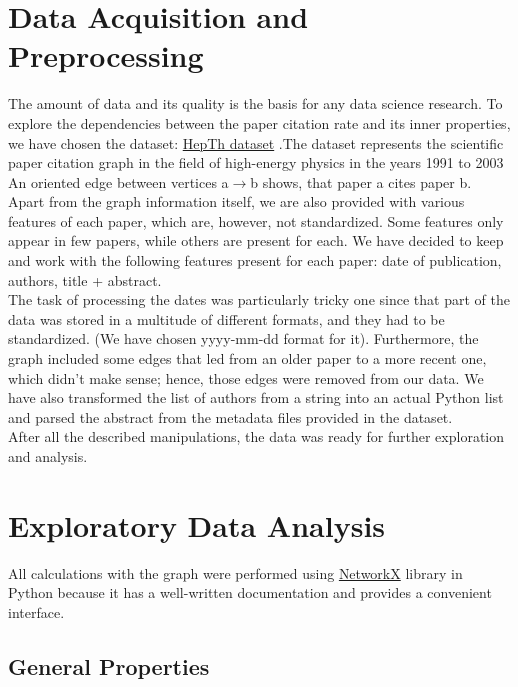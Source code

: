 \documentclass{article}
\newcommand\tab[1][1cm]{\hspace*{#1}}
\begin{document}
\section{Data Acquisition and Preprocessing}

\tab	The amount of data and its quality is the basis for any data science research. To explore the dependencies between the paper citation rate and its inner properties, we have chosen the dataset: \href{https://www.kaggle.com/datasets/wolfram77/graphs-snap-cit}{HepTh dataset} .The dataset represents the scientific paper citation graph in the field of high-energy physics in the years 1991 to 2003 \\
\tab	 An oriented edge between vertices a$\rightarrow$b shows, that paper a cites paper b. Apart from the graph information itself, we are also provided with various features of each paper, which are, however, not standardized. Some features only appear in few papers, while others are present for each. We have decided to keep and work with the following features present for each paper: date of publication, authors, title + abstract. \\
\tab	The task of processing the dates was particularly tricky one since that part of the data was stored in a multitude of different formats, and they had to be standardized. (We have chosen yyyy-mm-dd format for it). Furthermore, the graph included some edges that led from an older paper to a more recent one, which didn't make sense; hence, those edges were removed from our data. We have also transformed the list of authors from a string into an actual Python list and parsed the abstract from the metadata files provided in the dataset. \\
\tab	After all the described manipulations, the data was ready for further exploration and analysis. \\

\section{Exploratory Data Analysis}
\tab All calculations with the graph were performed using \href{https://networkx.org/}{NetworkX} library in Python because it has a well-written documentation and provides a convenient interface.
\subsection{General Properties}
\end{document}
